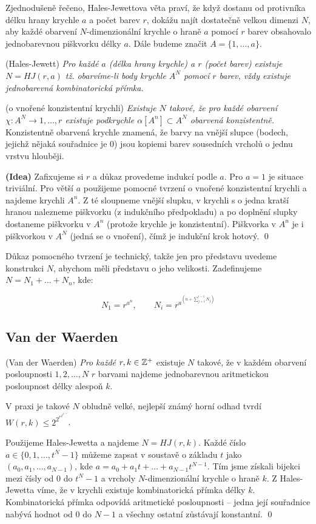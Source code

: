 Zjednodušeně řečeno, Hales-Jewettova věta praví, že když dostanu od protivníka délku hrany krychle $a$ a počet barev $r$, dokážu najít dostatečně velkou dimenzi $N$, aby každé obarvení $N$-dimenzionální krychle o hraně $a$ pomocí $r$ barev obsahovalo jednobarevnou piškvorku délky $a$. Dále budeme značit $A = \{1, \dots, a\}$.

\vt (Hales-Jewett) {\it Pro každé $a$ (délka hrany krychle) a $r$ (počet barev) existuje $N = HJ(r,a)$ tž. obarvíme-li body krychle $A^N$ pomocí $r$ barev, vždy existuje jednobarevná kombinatorická přímka.}

\tv (o vnořené konzistentní krychli) {\it Existuje $N$ takové, že pro každé obarvení $\chi: A^N \rightarrow {1,\dots, r}$ existuje podkrychle $\alpha[A^n] \subset A^N$ obarvená konzistentně.} Konzistentně obarvená krychle znamená, že barvy na vnější slupce (bodech, jejichž nějaká souřadnice je 0) jsou kopiemi barev sousedních vrcholů o jednu vrstvu hlouběji.

\dk \textbf{(Idea)} Zafixujeme si $r$ a důkaz provedeme indukcí podle $a$. Pro $a=1$ je situace triviální. Pro větší $a$ použijeme pomocné tvrzení o vnořené konzistentní krychli a najdeme krychli $A^n$. Z té sloupneme vnější slupku, v krychli s o jedna kratší hranou nalezneme piškvorku (z indukčního předpokladu) a po doplnění slupky dostaneme piškvorku v $A^n$ (protože krychle je konzistentní). Piškvorka v $A^n$ je i piškvorkou v $A^N$ (jedná se o vnoření), čímž je indukční krok hotový.
\qed

Důkaz pomocného tvrzení je technický, takže jen pro představu uvedeme konstrukci $N$, abychom měli představu o jeho velikosti. Zadefinujeme $N = N_1 + \dots + N_n$, kde:

$$N_1 = r^{a^n},\qquad N_i = r^{a^{\left(n+\sum_{j=1}^{i-1} N_j\right)}}$$

\subsection{Van der Waerden}

\vt (Van der Waerden) {\it Pro každé $r, k \in \mathbb{Z}^+$} existuje $N$ takové, že v každém obarvení posloupnosti ${1, 2, \dots, N}$ $r$ barvami najdeme jednobarevnou aritmetickou posloupnost délky alespoň $k$.

V praxi je takové $N$ obludně velké, nejlepší známý horní odhad tvrdí $W(r,k) \le 2^{2^{r^{2^{2^{k+9}}}}}$.

\dk Použijeme Hales-Jewetta a najdeme $N = HJ(r,k)$. Každé číslo $a \in \{0, 1, \dots, t^N-1\}$ můžeme zapsat v soustavě o základu $t$ jako $(a_0,a_1,\dots,a_{N-1})$, kde $a = a_0 + a_1t + \dots + a_{N-1}t^{N-1}$. Tím jsme získali bijekci mezi čísly od 0 do $t^N-1$ a vrcholy $N$-dimenzionální krychle o hraně $k$. Z Hales-Jewetta víme, že v krychli existuje kombinatorická přímka délky $k$. Kombinatorická přímka odpovídá aritmetické posloupnosti -- jedna její souřadnice nabývá hodnot od 0 do $N-1$ a všechny ostatní zůstávají konstantní.
\qed

